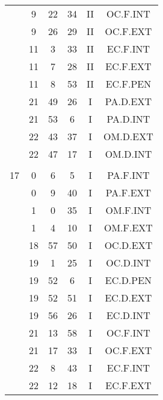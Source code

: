 \documentclass[12pt, a4paper]{article}
\begin{document}
\begin{multicols}{3}
{\begin{tabular}{c c c c c c}
	 	 	 	 & 9 & 22 & 34 & II & OC.F.INT\\%
	 	 	 	 & 9 & 26 & 29 & II & OC.F.EXT\\%
	 	 	 	 & 11 & 3 & 33 & II & EC.F.INT\\%
	 	 	 	 & 11 & 7 & 28 & II & EC.F.EXT\\%
	 	 	 	 & 11 & 8 & 53 & II & EC.F.PEN\\%
	 	 	 	 & 21 & 49 & 26 & I & PA.D.EXT\\%
	 	 	 	 & 21 & 53 & 6 & I & PA.D.INT\\%
	 	 	 	 & 22 & 43 & 37 & I & OM.D.EXT\\%
	 	 	 	 & 22 & 47 & 17 & I & OM.D.INT\\%
	 	 	 	 & & & & & \\%
	 	 	 	17 & 0 & 6 & 5 & I & PA.F.INT\\%
	 	 	 	 & 0 & 9 & 40 & I & PA.F.EXT\\%
	 	 	 	 & 1 & 0 & 35 & I & OM.F.INT\\%
	 	 	 	 & 1 & 4 & 10 & I & OM.F.EXT\\%
	 	 	 	 & 18 & 57 & 50 & I & OC.D.EXT\\%
	 	 	 	 & 19 & 1 & 25 & I & OC.D.INT\\%
	 	 	 	 & 19 & 52 & 6 & I & EC.D.PEN\\%
	 	 	 	 & 19 & 52 & 51 & I & EC.D.EXT\\%
	 	 	 	 & 19 & 56 & 26 & I & EC.D.INT\\%
	 	 	 	 & 21 & 13 & 58 & I & OC.F.INT\\%
	 	 	 	 & 21 & 17 & 33 & I & OC.F.EXT\\%
	 	 	 	 & 22 & 8 & 43 & I & EC.F.INT\\%
	 	 	 	 & 22 & 12 & 18 & I & EC.F.EXT\\%

\end{tabular}}
\end{multicols}
\end{document}

